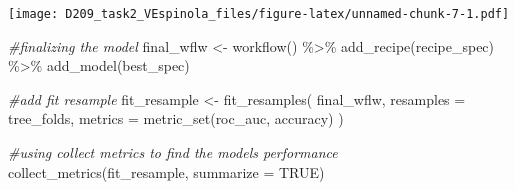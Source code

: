 \documentclass[
]{article}
\newenvironment{Shaded}{\begin{snugshade}}{\end{snugshade}}
\newcommand{\AttributeTok}[1]{\textcolor[rgb]{0.77,0.63,0.00}{#1}}
\newcommand{\CommentTok}[1]{\textcolor[rgb]{0.56,0.35,0.01}{\textit{#1}}}
\newcommand{\ConstantTok}[1]{\textcolor[rgb]{0.00,0.00,0.00}{#1}}
\newcommand{\DecValTok}[1]{\textcolor[rgb]{0.00,0.00,0.81}{#1}}
\newcommand{\FunctionTok}[1]{\textcolor[rgb]{0.00,0.00,0.00}{#1}}
\newcommand{\NormalTok}[1]{#1}
\newcommand{\OtherTok}[1]{\textcolor[rgb]{0.56,0.35,0.01}{#1}}
\newcommand{\SpecialCharTok}[1]{\textcolor[rgb]{0.00,0.00,0.00}{#1}}
\newcommand{\StringTok}[1]{\textcolor[rgb]{0.31,0.60,0.02}{#1}}
\begin{document}
\begin{Shaded}
\end{Shaded}

\texttt{[image: D209\_task2\_VEspinola\_files/figure-latex/unnamed-chunk-7-1.pdf]}

\begin{Shaded}
\begin{Highlighting}[]
\CommentTok{\#finalizing the model}
\NormalTok{final\_wflw }\OtherTok{\textless{}{-}} \FunctionTok{workflow}\NormalTok{() }\SpecialCharTok{\%\textgreater{}\%}
  \FunctionTok{add\_recipe}\NormalTok{(recipe\_spec) }\SpecialCharTok{\%\textgreater{}\%}
  \FunctionTok{add\_model}\NormalTok{(best\_spec)  }

\CommentTok{\#add fit resample}
\NormalTok{fit\_resample }\OtherTok{\textless{}{-}} \FunctionTok{fit\_resamples}\NormalTok{(}
\NormalTok{                            final\_wflw,}
                            \AttributeTok{resamples =}\NormalTok{ tree\_folds,}
                            \AttributeTok{metrics   =} \FunctionTok{metric\_set}\NormalTok{(roc\_auc, accuracy)}
\NormalTok{                    )}

\CommentTok{\#using collect metrics to find the models performance}
\FunctionTok{collect\_metrics}\NormalTok{(fit\_resample, }\AttributeTok{summarize =} \ConstantTok{TRUE}\NormalTok{)}
\end{Highlighting}
\end{Shaded}
\end{document}
